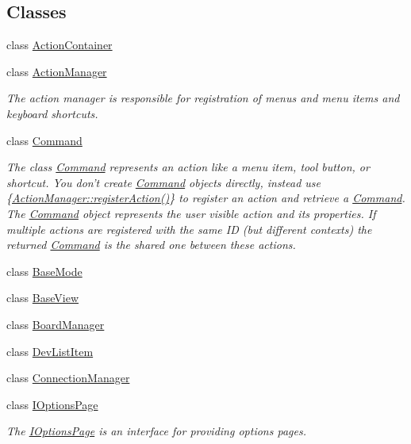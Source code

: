 \subsection*{\-Classes}
\begin{DoxyCompactItemize}
\item 
class \hyperlink{class_core_1_1_action_container}{\-Action\-Container}
\item 
class \hyperlink{class_core_1_1_action_manager}{\-Action\-Manager}
\begin{DoxyCompactList}\small\item\em \-The action manager is responsible for registration of menus and menu items and keyboard shortcuts. \end{DoxyCompactList}\item 
class \hyperlink{class_core_1_1_command}{\-Command}
\begin{DoxyCompactList}\small\item\em \-The class \hyperlink{class_core_1_1_command}{\-Command} represents an action like a menu item, tool button, or shortcut. \-You don't create \hyperlink{class_core_1_1_command}{\-Command} objects directly, instead use \{\hyperlink{group___core_plugin_ga316dd0cff29b294cd1b0631677f6357d}{\-Action\-Manager\-::register\-Action()}\} to register an action and retrieve a \hyperlink{class_core_1_1_command}{\-Command}. \-The \hyperlink{class_core_1_1_command}{\-Command} object represents the user visible action and its properties. \-If multiple actions are registered with the same \-I\-D (but different contexts) the returned \hyperlink{class_core_1_1_command}{\-Command} is the shared one between these actions. \end{DoxyCompactList}\item 
class \hyperlink{class_core_1_1_base_mode}{\-Base\-Mode}
\item 
class \hyperlink{class_core_1_1_base_view}{\-Base\-View}
\item 
class \hyperlink{class_core_1_1_board_manager}{\-Board\-Manager}
\item 
class \hyperlink{class_core_1_1_dev_list_item}{\-Dev\-List\-Item}
\item 
class \hyperlink{class_core_1_1_connection_manager}{\-Connection\-Manager}
\item 
class \hyperlink{class_core_1_1_i_options_page}{\-I\-Options\-Page}
\begin{DoxyCompactList}\small\item\em \-The \hyperlink{class_core_1_1_i_options_page}{\-I\-Options\-Page} is an interface for providing options pages. \end{DoxyCompactList}\item 

\end{DoxyCompactItemize}
